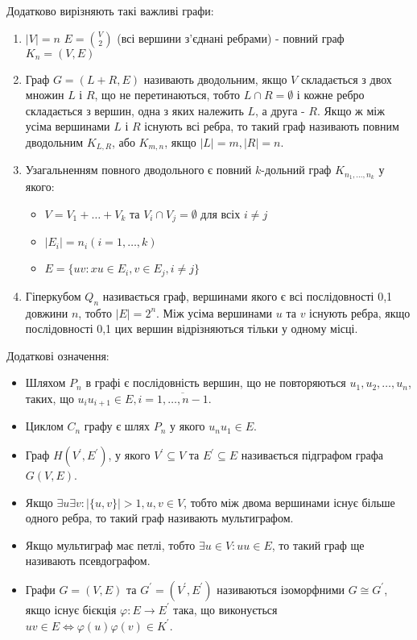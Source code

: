 Додатково вирізняють такі важливі графи:
\begin{enumerate}
        \item $\vert V \vert = n$ $E = {V \choose 2}$ (всі вершини з'єднані ребрами) - повний граф $K_n = (V,E)$
        \item Граф $G = (L+R,E)$ називають дводольним, якщо $V$ складається з двох множин $L$ і $R$, що не перетинаються, тобто $L \cap R = \emptyset$ і кожне ребро складається з вершин, одна з яких належить $L$, а друга - $R$. Якщо ж між усіма вершинами $L$ і $R$ існують всі ребра, то такий граф називають повним дводольним $K_{L,R}$, або $K_{m,n}$, якщо $\vert L \vert = m, \vert R \vert = n$.
        \item Узагальненням повного дводольного є повний $k$-дольний граф $K_{n_1,\dots,n_k}$ у якого:
        \begin{itemize}     
        \item $V=V_1+\dots+V_k$ та $V_i \cap V_j = \emptyset$ для всіх $i \ne j$
        \item $\vert E_i \vert = n_i (i=1,\dots,k)$
        \item $E = \lbrace uv : xu \in E_i, v \in E_j, i \ne j \rbrace$
        \end{itemize}
        \item Гіперкубом $Q_n$ називається граф, вершинами якого є всі послідовності 0,1 довжини $n$, тобто $\vert E \vert = 2^n$. Між усіма вершинами $u$ та $v$ існують ребра, якщо послідовності 0,1 цих вершин відрізняються тільки у одному місці.
\end{enumerate}

Додаткові означення:
\begin{itemize}
        \item Шляхом $P_n$ в графі є послідовність вершин, що не повторяються $u_1,u_2,\dots,u_n$, таких, що $u_iu_{i+1} \in E, i = \overline {1,\dots,n-1}$.
        \item Циклом $C_n$ графу є шлях $P_n$ у якого $u_nu_1 \in E$.
        \item Граф $H(V^\prime,E^\prime)$, у якого $V^\prime \subseteq V$ та $E^\prime \subseteq E$ називається підграфом графа $G(V,E)$.
        \item Якщо $\exists u \exists v : \vert \lbrace u,v \rbrace \vert > 1, u,v \in V$, тобто між двома вершинами існує більше одного ребра, то такий граф називають мультиграфом.
        \item Якщо мультиграф має петлі, тобто $\exists u \in V : uu \in E$, то такий граф ще називають псевдографом.
        \item Графи $G = (V,E)$ та $G^\prime = (V^\prime,E^\prime)$ називаються ізоморфними $G \cong G^\prime$, якщо існує бієкція $\varphi : E \to E^\prime$ така, що виконується $uv \in E \Leftrightarrow \varphi (u)\varphi (v) \in K^\prime$.
\end {itemize}


